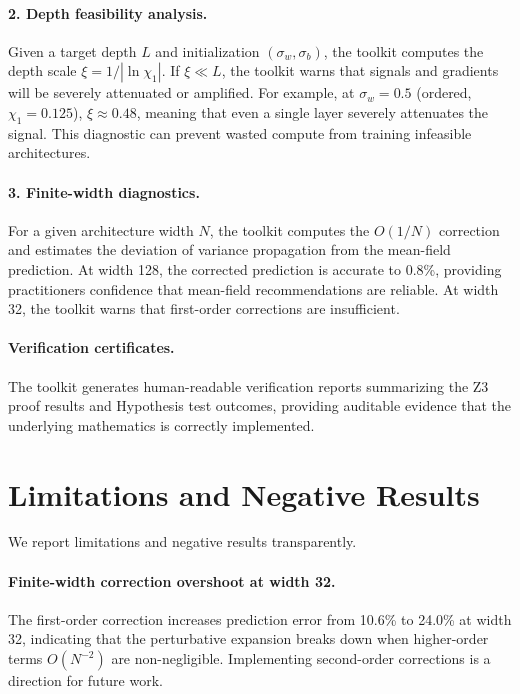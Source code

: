 \documentclass[10pt]{article}
\begin{document}
\paragraph{2. Depth feasibility analysis.}
Given a target depth $L$ and initialization $(\sigma_w, \sigma_b)$, the toolkit computes the depth scale $\xi = 1/|\ln \chi_1|$.
If $\xi \ll L$, the toolkit warns that signals and gradients will be severely attenuated or amplified.
For example, at $\sigma_w = 0.5$ (ordered, $\chi_1 = 0.125$), $\xi \approx 0.48$, meaning that even a single layer severely attenuates the signal.
This diagnostic can prevent wasted compute from training infeasible architectures.

\paragraph{3. Finite-width diagnostics.}
For a given architecture width $N$, the toolkit computes the $O(1/N)$ correction and estimates the deviation of variance propagation from the mean-field prediction.
At width 128, the corrected prediction is accurate to 0.8\%, providing practitioners confidence that mean-field recommendations are reliable.
At width 32, the toolkit warns that first-order corrections are insufficient.

\paragraph{Verification certificates.}
The toolkit generates human-readable verification reports summarizing the Z3 proof results and Hypothesis test outcomes, providing auditable evidence that the underlying mathematics is correctly implemented.

\section{Limitations and Negative Results}
\label{sec:limitations}

We report limitations and negative results transparently.

\paragraph{Finite-width correction overshoot at width 32.}
The first-order correction increases prediction error from 10.6\% to 24.0\% at width 32, indicating that the perturbative expansion breaks down when higher-order terms $O(N^{-2})$ are non-negligible.
Implementing second-order corrections is a direction for future work.
\end{document}
